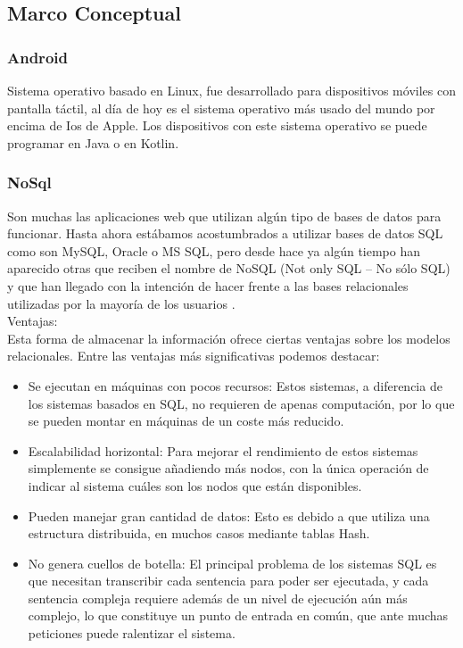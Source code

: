 \subsection{ Marco Conceptual}
\subsubsection{\textbf{Android}}
Sistema operativo basado en Linux, fue desarrollado para dispositivos móviles con pantalla táctil, al día de hoy es el sistema operativo más usado del mundo por encima de Ios de Apple. Los dispositivos con este sistema operativo se puede programar en Java o en Kotlin.\\

\subsubsection{\textbf{NoSql}}
Son muchas las aplicaciones web que utilizan algún tipo de bases de datos para funcionar. Hasta ahora estábamos acostumbrados a utilizar bases de datos SQL como son MySQL, Oracle o MS SQL, pero desde hace ya algún tiempo han aparecido otras que reciben el nombre de NoSQL (Not only SQL – No sólo SQL) y que han llegado con la intención de hacer frente a las bases relacionales utilizadas por la mayoría de los usuarios .\\
Ventajas:\\
Esta forma de almacenar la información ofrece ciertas ventajas sobre los modelos relacionales. Entre las ventajas más significativas podemos destacar:
\begin{itemize}
\item Se ejecutan en máquinas con pocos recursos: Estos sistemas, a diferencia de los sistemas basados en SQL, no requieren de apenas computación, por lo que se pueden montar en máquinas de un coste más reducido.
\item Escalabilidad horizontal: Para mejorar el rendimiento de estos sistemas simplemente se consigue añadiendo más nodos, con la única operación de indicar al sistema cuáles son los nodos que están disponibles.
\item Pueden manejar gran cantidad de datos: Esto es debido a que utiliza una estructura distribuida, en muchos casos mediante tablas Hash.
\item No genera cuellos de botella: El principal problema de los sistemas SQL es que necesitan transcribir cada sentencia para poder ser ejecutada, y cada sentencia compleja requiere además de un nivel de ejecución aún más complejo, lo que constituye un punto de entrada en común, que ante muchas peticiones puede ralentizar el sistema.
\end{itemize}

